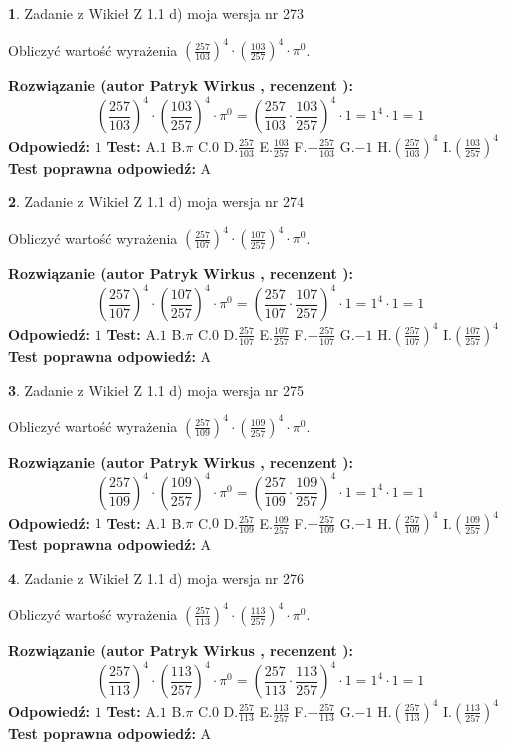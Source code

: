 \documentclass[12pt, a4paper]{article}
\theoremstyle{definition} %
\newtheorem{zad}{}
\newcommand{\zadStart}[1]{\begin{zad}#1\newline}
\newcommand{\zadStop}{\end{zad}}
\newcommand{\rozwStart}[2]{\noindent \textbf{Rozwiązanie (autor #1 , recenzent #2): }\newline}
\newcommand{\rozwStop}{\newline}
\newcommand{\odpStart}{\noindent \textbf{Odpowiedź:}\newline}
\newcommand{\odpStop}{\newline}
\newcommand{\testStart}{\noindent \textbf{Test:}\newline}
\newcommand{\testStop}{\newline}
\newcommand{\kluczStart}{\noindent \textbf{Test poprawna odpowiedź:}\newline}
\newcommand{\kluczStop}{\newline}
\begin{document}
\zadStart{Zadanie z Wikieł Z 1.1 d) moja wersja nr 273}

Obliczyć wartość wyrażenia $(\frac{257}{103})^{4} \cdot (\frac{103}{257})^{4} \cdot \pi^{0}$.
\zadStop
\rozwStart{Patryk Wirkus}{}
$$(\frac{257}{103})^{4} \cdot (\frac{103}{257})^{4} \cdot \pi^{0} = (\frac{257}{103} \cdot \frac{103}{257})^{4} \cdot 1 = 1^{4} \cdot 1 = 1$$
\rozwStop
\odpStart
$1$
\odpStop
\testStart
A.$1$ B.$\pi$ C.$0$ D.$\frac{257}{103}$ E.$\frac{103}{257}$
F.$-\frac{257}{103}$ G.$-1$
H.$(\frac{257}{103})^{4}$
I.$(\frac{103}{257})^{4}$
\testStop
\kluczStart
A
\kluczStop



\zadStart{Zadanie z Wikieł Z 1.1 d) moja wersja nr 274}

Obliczyć wartość wyrażenia $(\frac{257}{107})^{4} \cdot (\frac{107}{257})^{4} \cdot \pi^{0}$.
\zadStop
\rozwStart{Patryk Wirkus}{}
$$(\frac{257}{107})^{4} \cdot (\frac{107}{257})^{4} \cdot \pi^{0} = (\frac{257}{107} \cdot \frac{107}{257})^{4} \cdot 1 = 1^{4} \cdot 1 = 1$$
\rozwStop
\odpStart
$1$
\odpStop
\testStart
A.$1$ B.$\pi$ C.$0$ D.$\frac{257}{107}$ E.$\frac{107}{257}$
F.$-\frac{257}{107}$ G.$-1$
H.$(\frac{257}{107})^{4}$
I.$(\frac{107}{257})^{4}$
\testStop
\kluczStart
A
\kluczStop



\zadStart{Zadanie z Wikieł Z 1.1 d) moja wersja nr 275}

Obliczyć wartość wyrażenia $(\frac{257}{109})^{4} \cdot (\frac{109}{257})^{4} \cdot \pi^{0}$.
\zadStop
\rozwStart{Patryk Wirkus}{}
$$(\frac{257}{109})^{4} \cdot (\frac{109}{257})^{4} \cdot \pi^{0} = (\frac{257}{109} \cdot \frac{109}{257})^{4} \cdot 1 = 1^{4} \cdot 1 = 1$$
\rozwStop
\odpStart
$1$
\odpStop
\testStart
A.$1$ B.$\pi$ C.$0$ D.$\frac{257}{109}$ E.$\frac{109}{257}$
F.$-\frac{257}{109}$ G.$-1$
H.$(\frac{257}{109})^{4}$
I.$(\frac{109}{257})^{4}$
\testStop
\kluczStart
A
\kluczStop



\zadStart{Zadanie z Wikieł Z 1.1 d) moja wersja nr 276}

Obliczyć wartość wyrażenia $(\frac{257}{113})^{4} \cdot (\frac{113}{257})^{4} \cdot \pi^{0}$.
\zadStop
\rozwStart{Patryk Wirkus}{}
$$(\frac{257}{113})^{4} \cdot (\frac{113}{257})^{4} \cdot \pi^{0} = (\frac{257}{113} \cdot \frac{113}{257})^{4} \cdot 1 = 1^{4} \cdot 1 = 1$$
\rozwStop
\odpStart
$1$
\odpStop
\testStart
A.$1$ B.$\pi$ C.$0$ D.$\frac{257}{113}$ E.$\frac{113}{257}$
F.$-\frac{257}{113}$ G.$-1$
H.$(\frac{257}{113})^{4}$
I.$(\frac{113}{257})^{4}$
\testStop
\kluczStart
A
\kluczStop
\end{document}
